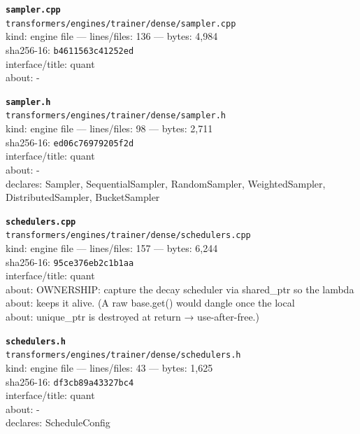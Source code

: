 \noindent\textbf{\texttt{sampler.cpp}}\\
\texttt{transformers/engines/trainer/dense/sampler.cpp}\\
kind: engine file --- lines/files: 136 --- bytes: 4,984\\
sha256-16: \texttt{b4611563c41252ed}\\
interface/title: quant\\
about: -\\
\vspace*{6.0pt}

\noindent\textbf{\texttt{sampler.h}}\\
\texttt{transformers/engines/trainer/dense/sampler.h}\\
kind: engine file --- lines/files: 98 --- bytes: 2,711\\
sha256-16: \texttt{ed06c76979205f2d}\\
interface/title: quant\\
about: -\\
declares: Sampler, SequentialSampler, RandomSampler, WeightedSampler, DistributedSampler, BucketSampler\\
\vspace*{6.0pt}
\newpage

\noindent\textbf{\texttt{schedulers.cpp}}\\
\texttt{transformers/engines/trainer/dense/schedulers.cpp}\\
kind: engine file --- lines/files: 157 --- bytes: 6,244\\
sha256-16: \texttt{95ce376eb2c1b1aa}\\
interface/title: quant\\
about: OWNERSHIP: capture the decay scheduler via shared\_ptr so the lambda\\
about: keeps it alive. (A raw base.get() would dangle once the local\\
about: unique\_ptr is destroyed at return → use-after-free.)\\
\vspace*{6.0pt}

\noindent\textbf{\texttt{schedulers.h}}\\
\texttt{transformers/engines/trainer/dense/schedulers.h}\\
kind: engine file --- lines/files: 43 --- bytes: 1,625\\
sha256-16: \texttt{df3cb89a43327bc4}\\
interface/title: quant\\
about: -\\
declares: ScheduleConfig\\
\vspace*{6.0pt}

